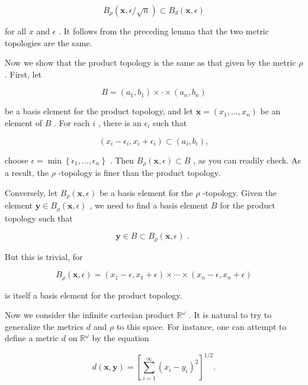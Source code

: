 \documentclass[10pt]{article}
\begin{document}
\[
{B}_{\rho }\left( {\mathbf{x},\epsilon /\sqrt{n}}\right)  \subset  {B}_{d}\left( {\mathbf{x},\epsilon }\right)
\]

for all \(x\) and \(\epsilon\) . It follows from the preceding lemma that the two metric topologies are the same.

Now we show that the product topology is the same as that given by the metric \(\rho\) . First, let

\[
B = \left( {{a}_{1},{b}_{1}}\right)  \times   \cdot   \times  \left( {{a}_{n},{b}_{n}}\right)
\]

be a basis element for the product topology, and let \(\mathbf{x} = \left( {{x}_{1},\ldots ,{x}_{n}}\right)\) be an element of \(B\) . For each \(i\) , there is an \({\epsilon }_{i}\) such that

\[
\left( {{x}_{i} - {\epsilon }_{i},{x}_{i} + {\epsilon }_{i}}\right)  \subset  \left( {{a}_{i},{b}_{i}}\right) ,
\]

choose \(\epsilon  = \min \left\{  {{\epsilon }_{1},\ldots ,{\epsilon }_{n}}\right\}\) . Then \({B}_{\rho }\left( {\mathbf{x},\epsilon }\right)  \subset  B\) , as you can readily check. As a result, the \(\rho\) -topology is finer than the product topology.

Conversely, let \({B}_{\rho }\left( {\mathbf{x},\epsilon }\right)\) be a basis element for the \(\rho\) -topology. Given the element \(\mathbf{y} \in  {B}_{\rho }\left( {\mathbf{x},\epsilon }\right)\) , we need to find a basis element \(B\) for the product topology such that

\[
\mathbf{y} \in  B \subset  {B}_{\rho }\left( {\mathbf{x},\epsilon }\right) \text{ . }
\]

But this is trivial, for

\[
{B}_{\rho }\left( {\mathbf{x},\epsilon }\right)  = \left( {{x}_{1} - \epsilon ,{x}_{1} + \epsilon }\right)  \times  \cdots  \times  \left( {{x}_{n} - \epsilon ,{x}_{n} + \epsilon }\right)
\]

is itself a basis element for the product topology.

Now we consider the infinite cartesian product \({\mathbb{R}}^{\omega }\) . It is natural to try to generalize the metrics \(d\) and \(\rho\) to this space. For instance, one can attempt to define a metric \(d\) on \({\mathbb{R}}^{\omega }\) by the equation

\[
d\left( {\mathbf{x},\mathbf{y}}\right)  = {\left\lbrack  \mathop{\sum }\limits_{{i = 1}}^{\infty }{\left( {x}_{i} - {y}_{i}\right) }^{2}\right\rbrack  }^{1/2}.
\]
\end{document}
